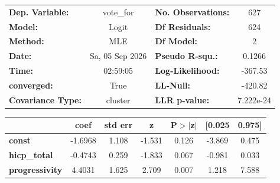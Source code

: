 \begin{center}
\begin{tabular}{lclc}
\toprule
\textbf{Dep. Variable:}   &    vote\_for    & \textbf{  No. Observations:  } &      627    \\
\textbf{Model:}           &      Logit      & \textbf{  Df Residuals:      } &      624    \\
\textbf{Method:}          &       MLE       & \textbf{  Df Model:          } &        2    \\
\textbf{Date:}            & Sa, 05 Sep 2026 & \textbf{  Pseudo R-squ.:     } &   0.1266    \\
\textbf{Time:}            &     02:59:05    & \textbf{  Log-Likelihood:    } &   -367.53   \\
\textbf{converged:}       &       True      & \textbf{  LL-Null:           } &   -420.82   \\
\textbf{Covariance Type:} &     cluster     & \textbf{  LLR p-value:       } & 7.222e-24   \\
\bottomrule
\end{tabular}
\begin{tabular}{lcccccc}
                       & \textbf{coef} & \textbf{std err} & \textbf{z} & \textbf{P$> |$z$|$} & \textbf{[0.025} & \textbf{0.975]}  \\
\midrule
\textbf{const}         &      -1.6968  &        1.108     &    -1.531  &         0.126        &       -3.869    &        0.475     \\
\textbf{hicp\_total}   &      -0.4743  &        0.259     &    -1.833  &         0.067        &       -0.981    &        0.033     \\
\textbf{progressivity} &       4.4031  &        1.625     &     2.709  &         0.007        &        1.218    &        7.588     \\
\bottomrule
\end{tabular}
\end{center}